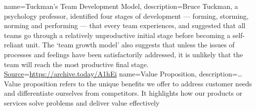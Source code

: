 %
{%
	name=Tuckman's Team Development Model,%
	description={Bruce Tuckman, a psychology professor, identified four stages of development --- forming, storming, norming and performing ---
	    that every team experiences, and suggested that all teams go through a relatively unproductive initial stage before becoming a self-reliant unit.
		The ‘team growth model’ also suggests that unless the issues of processes and feelings have been satisfactorily addressed,
		it is unlikely that the team will reach the most productive final stage.
		\href{https://www.uwindsor.ca/ctl/sites/uwindsor.ca.ctl/files/bruce_tuckmans_stages_of_team_development.pdf}{Source}=\url{https://archive.today/A1hEi}%
	}%
}
%
{%
	name=Value Proposition,%
	description={\dots {} Value proposition refers to the unique benefits we offer to address customer needs and differentiate ourselves from competitors. %
		It highlights how our products or services solve problems and deliver value effectively%
	}%
}

